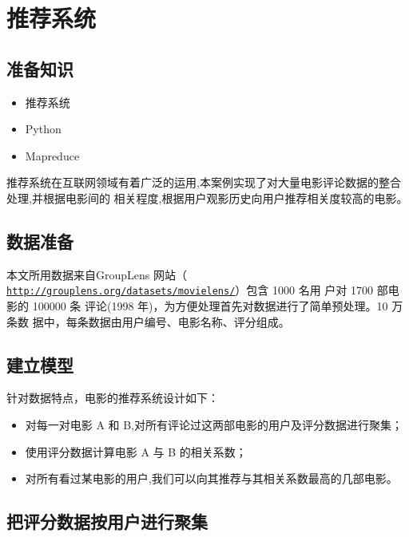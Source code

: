 \section{推荐系统}\label{ux5b9eux4f8bux5206ux6790ux57faux4e8e-mapreduce-ux7684ux7535ux5f71ux63a8ux8350ux7cfbux7edf}

\subsection{准备知识}\label{ux51c6ux5907ux77e5ux8bc6}

\begin{itemize}
\itemsep1pt\parskip0pt
\item
  推荐系统
\item
  Python
\item
  Mapreduce
\end{itemize}

推荐系统在互联网领域有着广泛的运用,本案例实现了对大量电影评论数据的整合处理,并根据电影间的
相关程度,根据用户观影历史向用户推荐相关度较高的电影。

\subsection{数据准备}\label{ux6570ux636eux51c6ux5907}

本文所用数据来自GroupLens 网站（
\href{http://grouplens.org/datasets/movielens/}{\lstinline|http://grouplens.org/datasets/movielens/|}）包含
1000 名用 户对 1700 部电影的 100000 条 评论(1998
年)，为方便处理首先对数据进行了简单预处理。10 万条数
据中，每条数据由用户编号、电影名称、评分组成。

\subsection{建立模型}\label{ux5efaux7acbux6a21ux578b}

针对数据特点，电影的推荐系统设计如下：

\begin{itemize}
\item
  对每一对电影 A 和 B,对所有评论过这两部电影的用户及评分数据进行聚集；
\item
  使用评分数据计算电影 A 与 B 的相关系数；
\item
  对所有看过某电影的用户,我们可以向其推荐与其相关系数最高的几部电影。
\end{itemize}


\subsection{把评分数据按用户进行聚集}\label{ux628aux8bc4ux5206ux6570ux636eux6309ux7528ux6237ux8fdbux884cux805aux96c6}

